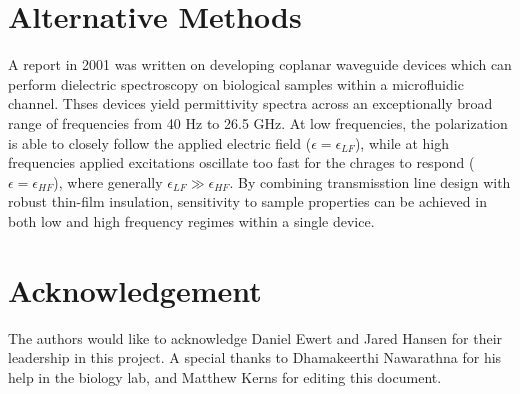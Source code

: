 \documentclass[journal]{IEEEtran}
\begin{document}
\section{Alternative Methods}
A report in 2001 was written on developing coplanar waveguide devices which can perform dielectric spectroscopy on biological samples within a microfluidic channel. Thses devices yield permittivity spectra across an exceptionally broad range of frequencies from 40 Hz to 26.5 GHz. At low frequencies, the polarization is able to closely follow the applied electric field ($\epsilon = \epsilon_{LF}$), while at high frequencies applied excitations oscillate too fast for the chrages to respond ($\epsilon=\epsilon_{HF}$), where generally $\epsilon_{LF} \gg \epsilon_{HF}$. By combining transmisstion line design with robust thin-film insulation, sensitivity to sample properties can be achieved in both low and high frequency regimes within a single device.

\section{Acknowledgement}
The authors would like to acknowledge Daniel Ewert and Jared Hansen for their leadership in this project. A special thanks to Dhamakeerthi Nawarathna for his help in the biology lab, and Matthew Kerns for editing this document.
\end{document}
